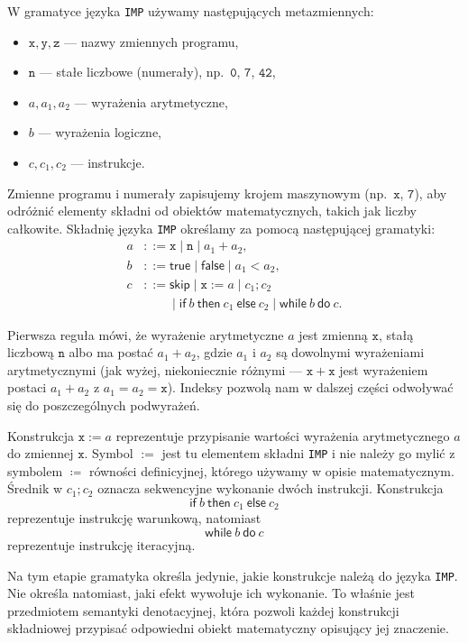 \documentclass[11pt,a4paper]{article}
\theoremstyle{definition}
\theoremstyle{plain}
\newcommand{\kw}[1]{\ensuremath{\mathsf{#1}}} %
\begin{document}
W gramatyce języka \texttt{IMP} używamy następujących metazmiennych:
\begin{itemize}
	\item $\mathtt{x},\mathtt{y},\mathtt{z}$ --- nazwy zmiennych programu,
	\item $\mathtt{n}$ --- stałe liczbowe (numerały), np.\ $\mathtt{0}$, $\mathtt{7}$, $\mathtt{42}$,
	\item $a,a_1,a_2$ --- wyrażenia arytmetyczne,
	\item $b$ --- wyrażenia logiczne,
	\item $c,c_1,c_2$ --- instrukcje.
\end{itemize}
Zmienne programu i numerały zapisujemy krojem maszynowym (np.\ $\mathtt{x}$,
$\mathtt{7}$), aby odróżnić elementy składni od obiektów matematycznych,
takich jak liczby całkowite.
Składnię języka \texttt{IMP} określamy za pomocą następującej gramatyki:
\[
\begin{aligned}
	a
	&::=
	\mathtt{x}
	\mid \mathtt{n}
	\mid a_1 + a_2,
	\\[2mm]
	b
	&::=
	\kw{true}
	\mid \kw{false}
	\mid a_1 < a_2,
	\\[2mm]
	c
	&::=
	\kw{skip}
	\mid
	\mathtt{x} := a
	\mid
	c_1 ; c_2
	\\
	&\qquad\mid
	\kw{if}\ b\
	\kw{then}\ c_1\
	\kw{else}\ c_2
	\mid
	\kw{while}\ b\
	\kw{do}\ c.
\end{aligned}
\]

Pierwsza reguła mówi, że wyrażenie arytmetyczne $a$ jest
zmienną $\mathtt{x}$, stałą liczbową $\mathtt{n}$ albo ma postać $a_1+a_2$, gdzie $a_1$ i $a_2$
są dowolnymi wyrażeniami arytmetycznymi (jak wyżej, niekoniecznie różnymi ---
$\mathtt{x}+\mathtt{x}$ jest wyrażeniem postaci $a_1+a_2$ z $a_1=a_2=\mathtt{x}$). Indeksy pozwolą nam
w dalszej części odwoływać się do poszczególnych podwyrażeń.

Konstrukcja $\mathtt{x} := a$ reprezentuje przypisanie wartości wyrażenia
arytmetycznego $a$ do zmiennej $\mathtt{x}$. Symbol $:=$ jest tu elementem składni
\texttt{IMP} i nie należy go mylić z symbolem $\coloneqq$ równości
definicyjnej, którego używamy w opisie matematycznym. Średnik w $c_1;c_2$ oznacza sekwencyjne
wykonanie dwóch instrukcji. Konstrukcja
\[
\kw{if}\ b\
\kw{then}\ c_1\
\kw{else}\ c_2
\]
reprezentuje instrukcję warunkową, natomiast
\[
\kw{while}\ b\
\kw{do}\ c
\]
reprezentuje instrukcję iteracyjną.

Na tym etapie gramatyka określa jedynie, jakie konstrukcje należą do języka
\texttt{IMP}. Nie określa natomiast, jaki efekt wywołuje ich wykonanie. To
właśnie jest przedmiotem semantyki denotacyjnej, która pozwoli każdej
konstrukcji składniowej przypisać odpowiedni obiekt matematyczny opisujący
jej znaczenie.
\end{document}
